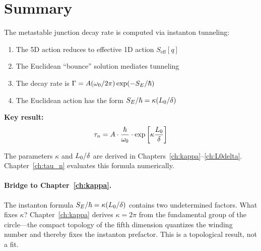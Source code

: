 \section{Summary}
\label{sec:instanton:summary}

\begin{resultbox}
    The metastable junction decay rate is computed via instanton tunneling:
    \begin{enumerate}
        \item The 5D action reduces to effective 1D action $S_{\text{eff}}[q]$
        \item The Euclidean ``bounce'' solution mediates tunneling
        \item The decay rate is $\Gamma = A(\omega_0/2\pi) \exp(-S_E/\hbar)$
        \item The Euclidean action has the form $S_E/\hbar = \kappa(L_0/\delta)$
    \end{enumerate}

    \textbf{Key result:}
    \begin{equation*}
        \tau_n = A \cdot \frac{\hbar}{\omega_0} \cdot \exp\left[\kappa \frac{L_0}{\delta}\right]
    \end{equation*}

    The parameters $\kappa$ and $L_0/\delta$ are derived in
    Chapters~\ref{ch:kappa}--\ref{ch:L0delta}. Chapter~\ref{ch:tau_n}
    evaluates this formula numerically.
\end{resultbox}

\paragraph{Bridge to Chapter~\ref{ch:kappa}.}
The instanton formula $S_E/\hbar = \kappa(L_0/\delta)$ contains two
undetermined factors. What fixes $\kappa$? Chapter~\ref{ch:kappa} derives
$\kappa = 2\pi$ from the fundamental group of the circle---the compact
topology of the fifth dimension quantizes the winding number and thereby
fixes the instanton prefactor. This is a topological result, not a fit.
